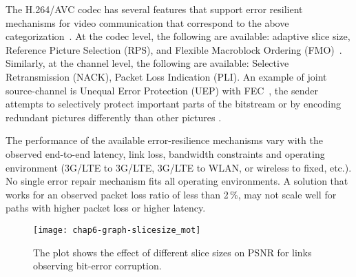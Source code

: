 The H.264/AVC codec has several features that support error resilient
mechanisms for video communication that correspond to the above
categorization~\cite{310669}. At the codec level, the following are available:
adaptive slice size, Reference Picture Selection (RPS), and Flexible
Macroblock Ordering (FMO)~\cite{err_res_h264_std, wenger_ott_jscc}. Similarly,
at the channel level, the following are available: Selective Retransmission
(NACK), Packet Loss Indication (PLI). An example of joint source-channel is
Unequal Error Protection (UEP) with FEC~\cite{wang00review}, the sender
attempts to selectively protect important parts of the bitstream or by
encoding redundant pictures differently than other pictures \cite{ervcuupkp}.

The performance of the available error-resilience mechanisms vary with the
observed end-to-end latency, link loss, bandwidth constraints and operating
environment (3G/LTE to 3G/LTE, 3G/LTE to WLAN, or wireless to fixed, etc.). No
single error repair mechanism fits all operating environments. A solution that
works for an observed packet loss ratio of less than 2\,\%, may not scale well
for paths with higher packet loss or higher latency.


\begin{figure}
\centerline {
\texttt{[image: chap6-graph-slicesize\_mot]}
}
\caption{The plot shows the effect of different slice sizes on PSNR for links
observing bit-error corruption.}
\label{fig:slicesize_mot}
\end{figure}

